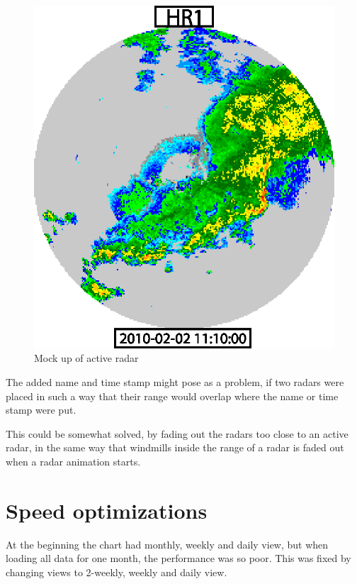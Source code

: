 \begin{figure}[htbp]
\begin{minipage}[b]{0.5\linewidth}
    \centering
    \includegraphics[width=\linewidth]{figure/radar2.eps}
    \caption{Mock up of active radar}
    \label{fig:mock_up_active_radar}
  \end{minipage}
\end{figure}
The added name and time stamp might pose as a problem, if two radars were placed in such a way that their range would overlap where the name or time stamp were put.

This could be somewhat solved, by fading out the radars too close to an active radar, in the same way that windmills inside the range of a radar is faded out when a radar animation starts.

\section{Speed optimizations}
At the beginning the chart had monthly, weekly and daily view, but when loading all data for one month, the performance was so poor. This was fixed by changing views to 2-weekly, weekly and daily view.

